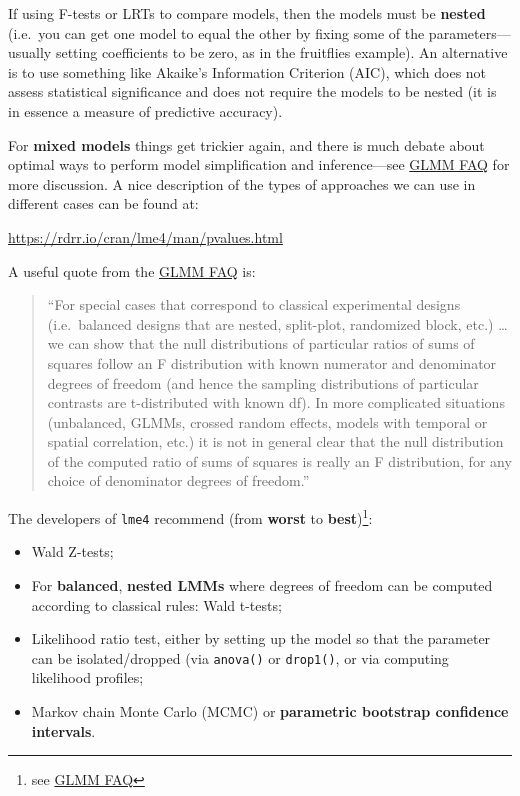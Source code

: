 \documentclass[]{book}
\providecommand{\tightlist}{%
  \setlength{\itemsep}{0pt}\setlength{\parskip}{0pt}}
\let\rmarkdownfootnote\footnote%
\def\footnote{\protect\rmarkdownfootnote}
\theoremstyle{definition}
\theoremstyle{definition}
\theoremstyle{definition}
\theoremstyle{remark}
\begin{document}
If using F-tests or LRTs to compare models, then the models must be
\textbf{nested} (i.e.~you can get one model to equal the other by fixing
some of the parameters---usually setting coefficients to be zero, as in
the fruitflies example). An alternative is to use something like
Akaike's Information Criterion (AIC), which does not assess statistical
significance and does not require the models to be nested (it is in
essence a measure of predictive accuracy).

For \textbf{mixed models} things get trickier again, and there is much
debate about optimal ways to perform model simplification and
inference---see
\href{https://bbolker.github.io/mixedmodels-misc/glmmFAQ.html}{GLMM FAQ}
for more discussion. A nice description of the types of approaches we
can use in different cases can be found at:

\url{https://rdrr.io/cran/lme4/man/pvalues.html}

A useful quote from the
\href{https://bbolker.github.io/mixedmodels-misc/glmmFAQ.html}{GLMM FAQ}
is:

\begin{quote}
``For special cases that correspond to classical experimental designs
(i.e.~balanced designs that are nested, split-plot, randomized block,
etc.) \ldots{} we can show that the null distributions of particular
ratios of sums of squares follow an F distribution with known numerator
and denominator degrees of freedom (and hence the sampling distributions
of particular contrasts are t-distributed with known df). In more
complicated situations (unbalanced, GLMMs, crossed random effects,
models with temporal or spatial correlation, etc.) it is not in general
clear that the null distribution of the computed ratio of sums of
squares is really an F distribution, for any choice of denominator
degrees of freedom.''
\end{quote}

The developers of \texttt{lme4} recommend (from \textbf{worst} to
\textbf{best})\footnote{see
  \href{https://bbolker.github.io/mixedmodels-misc/glmmFAQ.html}{GLMM
  FAQ}}:

\begin{itemize}
\tightlist
\item
  Wald Z-tests;
\item
  For \textbf{balanced}, \textbf{nested LMMs} where degrees of freedom
  can be computed according to classical rules: Wald t-tests;
\item
  Likelihood ratio test, either by setting up the model so that the
  parameter can be isolated/dropped (via \texttt{anova()} or
  \texttt{drop1()}, or via computing likelihood profiles;
\item
  Markov chain Monte Carlo (MCMC) or \textbf{parametric bootstrap
  confidence intervals}.
\end{itemize}
\end{document}
